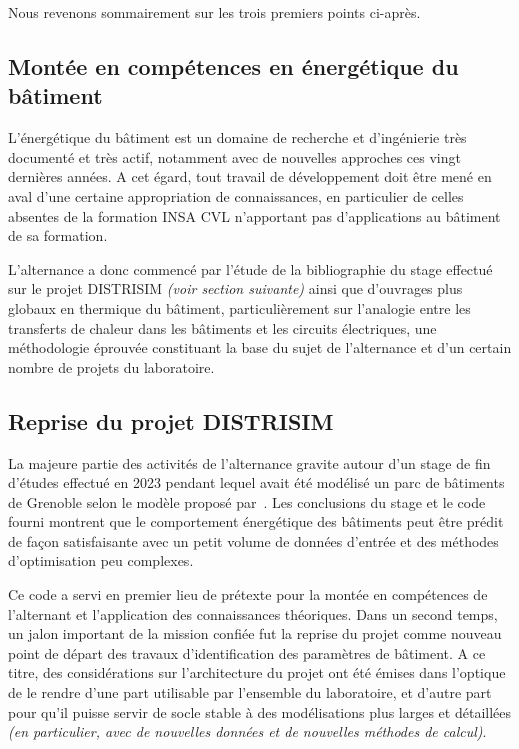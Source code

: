 Nous revenons sommairement sur les trois premiers points ci-après.

\subsection{Montée en compétences en énergétique du bâtiment}\label{sec:montee-en-competences-en-energetique-du-batiment}

L'énergétique du bâtiment est un domaine de recherche et d'ingénierie très documenté et très actif, notamment avec de nouvelles approches ces vingt dernières années.
A cet égard, tout travail de développement doit être mené en aval d'une certaine appropriation de connaissances, en particulier de celles absentes de la formation INSA CVL n'apportant pas d'applications au bâtiment de sa formation.

L'alternance a donc commencé par l'étude de la bibliographie du stage effectué sur le projet DISTRISIM \textit{(voir section suivante)} ainsi que d'ouvrages plus globaux en thermique du bâtiment, particulièrement sur l'analogie entre les transferts de chaleur dans les bâtiments et les circuits électriques, une méthodologie éprouvée constituant la base du sujet de l'alternance et d'un certain nombre de projets du laboratoire.

\subsection{Reprise du projet DISTRISIM}\label{sec:reprise-du-projet-distrisim}

La majeure partie des activités de l'alternance gravite autour d'un stage de fin d'études effectué en 2023 pendant lequel avait été modélisé un parc de bâtiments de Grenoble selon le modèle proposé par~\cite{aoun}.
Les conclusions du stage et le code fourni montrent que le comportement énergétique des bâtiments peut être prédit de façon satisfaisante avec un petit volume de données d'entrée et des méthodes d'optimisation peu complexes.

Ce code a servi en premier lieu de prétexte pour la montée en compétences de l'alternant et l'application des connaissances théoriques.
Dans un second temps, un jalon important de la mission confiée fut la reprise du projet comme nouveau point de départ des travaux d'identification des paramètres de bâtiment.
A ce titre, des considérations sur l'architecture du projet ont été émises dans l'optique de le rendre d'une part utilisable par l'ensemble du laboratoire, et d'autre part pour qu'il puisse servir de socle stable à des modélisations plus larges et détaillées \textit{(en particulier, avec de nouvelles données et de nouvelles méthodes de calcul)}.

